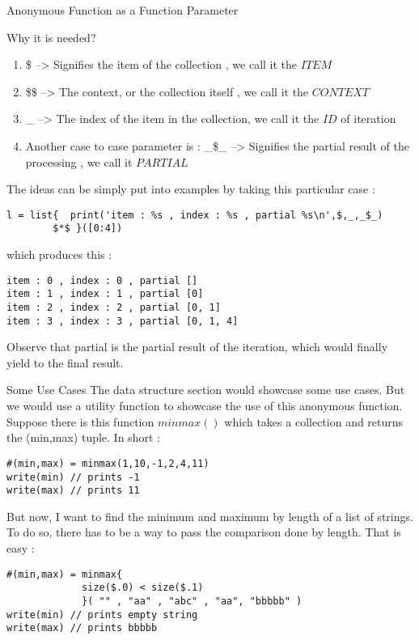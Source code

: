 \begin{section}{Anonymous Function as a Function Parameter}
\begin{subsection}{Why it is needed?}
\begin{enumerate}
\item{ \$ --> Signifies the item of the collection , we call it the $ITEM$ }
\item{ \$\$ --> The context, or the collection itself , we call it the $CONTEXT$} 
\item{ \_ --> The index of the item in the collection, we call it the $ID$ of iteration } 
\item{ Another case to case parameter is :
     \_\$\_ --> Signifies the partial result of the processing , we call it $PARTIAL$ }
\end{enumerate}

The ideas can be simply put into examples by taking this particular case :

\begin{lstlisting}[style=JexlStyle]
l = list{  print('item : %s , index : %s , partial %s\n',$,_,_$_) 
        $*$ }([0:4])
\end{lstlisting}
which produces this :

\begin{lstlisting}[style=all]
item : 0 , index : 0 , partial []
item : 1 , index : 1 , partial [0]
item : 2 , index : 2 , partial [0, 1]
item : 3 , index : 3 , partial [0, 1, 4]
\end{lstlisting}

Observe that partial is the partial result of the iteration, 
which would finally yield to the final result. 

\end{subsection}

\begin{subsection}{Some Use Cases}
The data structure section would showcase some use cases. 
But we would use a utility function to showcase the use of this anonymous function.
Suppose there is this function $minmax()$  which takes a collection and returns the (min,max) tuple.
In short :

\begin{lstlisting}[style=JexlStyle]
#(min,max) = minmax(1,10,-1,2,4,11)
write(min) // prints -1
write(max) // prints 11    
\end{lstlisting}
But now, I want to find the minimum and maximum by length of a list of strings.
To do so, there has to be a way to pass the comparison done by length.
That is easy :

\begin{lstlisting}[style=JexlStyle]
#(min,max) = minmax{
             size($.0) < size($.1) 
             }( "" , "aa" , "abc" , "aa", "bbbbb" )
write(min) // prints empty string 
write(max) // prints bbbbb    
\end{lstlisting}

\end{subsection}

\end{section}

